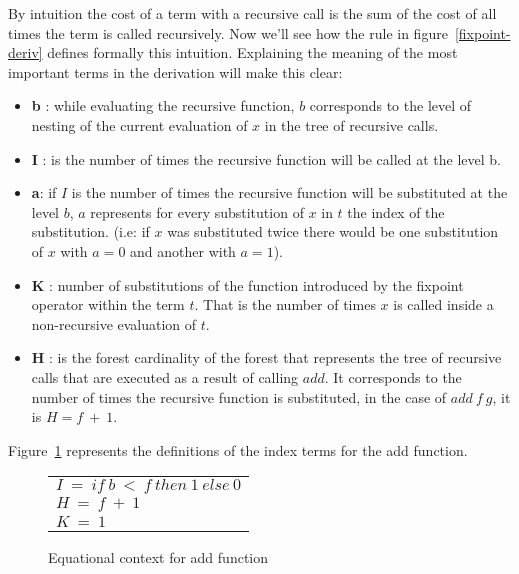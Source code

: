 \documentclass[a4paper,12pt]{article}
\begin{document}
By intuition the cost of a term with a recursive call is the sum of
the cost of all times the term is called recursively. Now we'll see
how the rule in figure~\ref{fixpoint-deriv} defines formally this
intuition. Explaining the meaning of the most important terms in the
derivation will make this clear:

\begin{itemize}


\item \textbf{b} : while evaluating the recursive function, $b$
  corresponds to the level of nesting of the current evaluation of $x$
 in the tree of recursive calls.
\item \textbf{I} : is the number of times the recursive function will be called at
the level b. 
\item \textbf{a}: if $I$ is the number of times the recursive function
  will be substituted at the level $b$, $a$ represents for every
  substitution of $x$ in $t$ the index of the substitution. (i.e: if
  $x$ was substituted twice there would be one substitution of $x$
  with $a=0$ and another with $a=1$).
\item \textbf{K} : number of substitutions of the function introduced
by the fixpoint operator 
within the term $t$. That is the number of times $x$ is called inside
a non-recursive evaluation of $t$.
\item \textbf{H} : is the forest cardinality of the forest that
  represents the tree of recursive calls that are executed as a result
  of calling $add$. It corresponds to the number of times the
  recursive function is substituted, in the case of $add~f~g$, it is
  $H=f~+~1$.

\end{itemize}

Figure~\ref{definitionindexterms} represents the definitions of the index
terms for the add function.


\begin{figure}[ht]
\begin{center}
  \begin{tabular}{l}
    $I~=~if~b~<~f~then~1~else~0$ \\

    $H~=~f~+~1$ \\

    $K~=~1$ \\
  \end{tabular}
\end{center}
\caption{Equational context for add function}
\label{definitionindexterms}
\end{figure}
\end{document}
